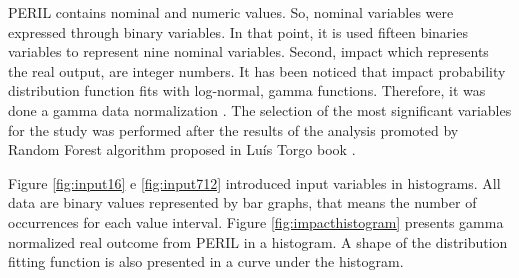 PERIL contains nominal and numeric values. So, nominal variables were expressed through binary variables. In that point, it is used fifteen binaries variables to represent nine nominal variables. Second, impact which represents the real output, are integer numbers. It has been noticed that impact probability distribution function fits with log-normal, gamma functions. Therefore, it was done a gamma data normalization \cite{han2006data}. The selection of the most significant variables for the study was performed after the results of the analysis promoted by Random Forest algorithm proposed in Luís Torgo book \cite{torgo2003data}.

Figure \ref{fig:input16} e \ref{fig:input712} introduced input variables in histograms. All data are binary values represented by bar graphs, that means the number of occurrences for each value interval. Figure \ref{fig:impacthistogram} presents gamma normalized real outcome from PERIL in a histogram. A shape of the distribution fitting function is also presented in a curve under the histogram.

